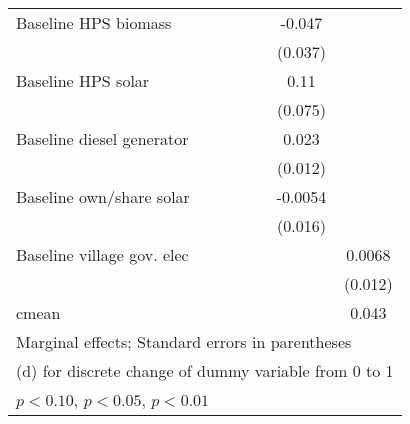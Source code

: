 \begin{table}[htbp]
\begin{tabular*}{1\hsize}{@{\hskip\tabcolsep\extracolsep\fill}l*{6}{c}}
Baseline HPS biomass&                  &                  &                  &                  &   -0.047         &                  \\
                &                  &                  &                  &                  &  (0.037)         &                  \\
Baseline HPS solar&                  &                  &                  &                  &     0.11         &                  \\
                &                  &                  &                  &                  &  (0.075)         &                  \\
Baseline diesel generator&                  &                  &                  &                  &    0.023\sym{*}  &                  \\
                &                  &                  &                  &                  &  (0.012)         &                  \\
Baseline own/share solar&                  &                  &                  &                  &  -0.0054         &                  \\
                &                  &                  &                  &                  &  (0.016)         &                  \\
Baseline village gov. elec&                  &                  &                  &                  &                  &   0.0068         \\
                &                  &                  &                  &                  &                  &  (0.012)         \\
\midrule
cmean           &                  &                  &                  &                  &                  &    0.043         \\
\bottomrule
\multicolumn{7}{l}{\footnotesize Marginal effects; Standard errors in parentheses}\\
\multicolumn{7}{l}{\footnotesize  (d) for discrete change of dummy variable from 0 to 1}\\
\multicolumn{7}{l}{\footnotesize \sym{*} \(p<0.10\), \sym{**} \(p<0.05\), \sym{***} \(p<0.01\)}\\
\end{tabular*}
\end{table}
